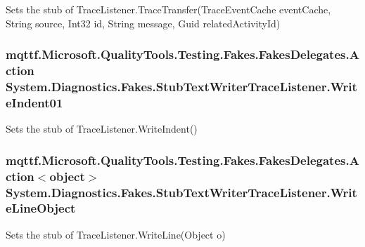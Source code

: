 Sets the stub of Trace\-Listener.\-Trace\-Transfer(\-Trace\-Event\-Cache event\-Cache, String source, Int32 id, String message, Guid related\-Activity\-Id)

\hypertarget{class_system_1_1_diagnostics_1_1_fakes_1_1_stub_text_writer_trace_listener_a043bfaf869729b955f1a4ef5d6d1f395}{
\subsubsection[{Write\-Indent01}]{\setlength{\rightskip}{0pt plus 5cm}mqttf.\-Microsoft.\-Quality\-Tools.\-Testing.\-Fakes.\-Fakes\-Delegates.\-Action System.\-Diagnostics.\-Fakes.\-Stub\-Text\-Writer\-Trace\-Listener.\-Write\-Indent01}}\label{class_system_1_1_diagnostics_1_1_fakes_1_1_stub_text_writer_trace_listener_a043bfaf869729b955f1a4ef5d6d1f395}


Sets the stub of Trace\-Listener.\-Write\-Indent()

\hypertarget{class_system_1_1_diagnostics_1_1_fakes_1_1_stub_text_writer_trace_listener_ab0fbb46d59d02a9d5f3916122133d1e2}{
\subsubsection[{Write\-Line\-Object}]{\setlength{\rightskip}{0pt plus 5cm}mqttf.\-Microsoft.\-Quality\-Tools.\-Testing.\-Fakes.\-Fakes\-Delegates.\-Action$<$object$>$ System.\-Diagnostics.\-Fakes.\-Stub\-Text\-Writer\-Trace\-Listener.\-Write\-Line\-Object}}\label{class_system_1_1_diagnostics_1_1_fakes_1_1_stub_text_writer_trace_listener_ab0fbb46d59d02a9d5f3916122133d1e2}


Sets the stub of Trace\-Listener.\-Write\-Line(\-Object o)

